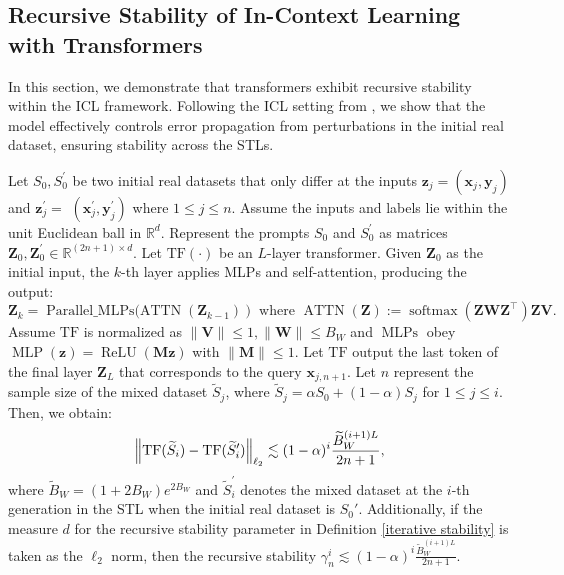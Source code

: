 \subsection{Recursive Stability of In-Context Learning with Transformers}\label{subsection_tra2}
In this section, we demonstrate that transformers exhibit recursive stability within the ICL framework. Following the ICL setting from \cite{li2023transformers}, we show that the model effectively controls error propagation from perturbations in the initial real dataset, ensuring stability across the STLs.
\begin{theorem}\label{therorem_stability of transformer} Let $S_{0}, S_0^{\prime}$ be two initial real datasets that only differ at the inputs $\boldsymbol{z}_j=\left(\boldsymbol{x}_j, \boldsymbol{y}_j\right)$ and $\boldsymbol{z}_j^{\prime}=$ $\left(\boldsymbol{x}_j^{\prime}, \boldsymbol{y}_j^{\prime}\right)$ where $1\leq j\leq n$. Assume the inputs and labels lie within the unit Euclidean ball in $\mathbb{R}^d$. Represent the prompts $S_{0}$ and $S_0^{\prime}$ as matrices $\boldsymbol{Z}_0, \boldsymbol{Z}_0^{\prime} \in \mathbb{R}^{(2n+1) \times d}$. Let $\mathrm{TF}(\cdot)$ be an $L$-layer transformer. Given $\boldsymbol{Z}_{0}$ as the initial input, the $k$-th layer applies MLPs and self-attention, producing the output:
$$
\left.\boldsymbol{Z}_{k}=\operatorname{Parallel\_\operatorname {MLPs}(ATTN}\left(\boldsymbol{Z}_{k-1}\right)\right) \text { where } \operatorname{ATTN}(\boldsymbol{Z}):=\operatorname{softmax}\left(\boldsymbol{Z} \boldsymbol{W} \boldsymbol{Z}^{\top}\right) \boldsymbol{Z} \boldsymbol{V}.
$$
Assume $\mathrm{TF}$ is normalized as $\|\boldsymbol{V}\| \leq 1,\|\boldsymbol{W}\| \leq B_W $ and $\operatorname{MLPs}$ obey $\operatorname {MLP}(\boldsymbol{z})=\operatorname{ReLU}(\boldsymbol{M} \boldsymbol{z})$ with $\|\boldsymbol{M}\| \leq 1$. Let $\mathrm{TF}$ output the last token of the final layer $\boldsymbol{Z}_{L}$ that corresponds to the query $\boldsymbol{x}_{j, n+1}$. Let $n$ represent the sample size of the mixed dataset $\widetilde{S}_j$, where $\widetilde{S}_j=\alpha S_0+(1-\alpha) S_j$ for $1 \leq j \leq i$. Then, we obtain:
\begin{align}
     \left\|\operatorname{TF}(\widetilde{S}_i)-\operatorname{TF}(\widetilde{S}_i^{\prime})\right\|_{\ell_2}\lesssim 
   (1-\alpha)^i \frac{\widetilde{B}_W^{(i+1)L}}{2n+1},\notag 
\end{align}
where $\widetilde{B}_W=\left(1+2 B_W\right) e^{2 B_W}$ and $\widetilde{S}_i^{\prime}$ denotes the mixed dataset at the $i$-th generation in the STL when the initial real dataset is $S_0'$. Additionally, if the measure $d$ for the recursive stability parameter in Definition \ref{iterative stability} is taken as the $\ell_2$ norm, then the recursive stability $\gamma_n^i \lesssim  (1-\alpha)^i \frac{\widetilde{B}_W^{(i+1)L}}{2n+1}$.    
\end{theorem}

